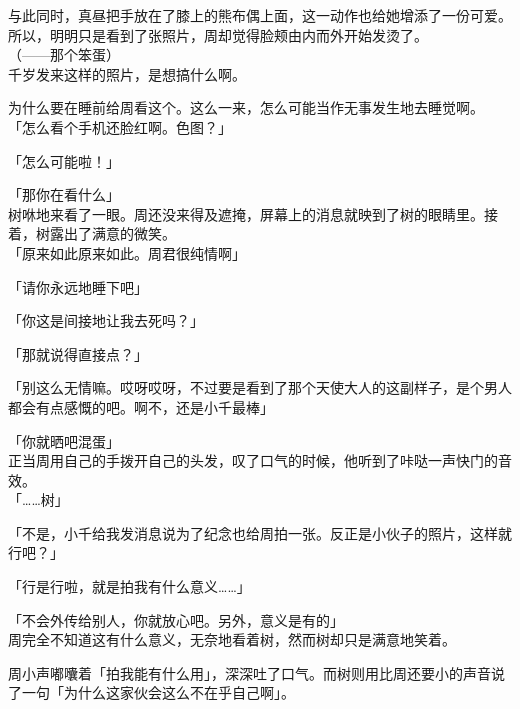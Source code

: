 与此同时，真昼把手放在了膝上的熊布偶上面，这一动作也给她增添了一份可爱。所以，明明只是看到了张照片，周却觉得脸颊由内而外开始发烫了。\\

（——那个笨蛋）\\

千岁发来这样的照片，是想搞什么啊。

为什么要在睡前给周看这个。这么一来，怎么可能当作无事发生地去睡觉啊。\\

「怎么看个手机还脸红啊。色图？」

「怎么可能啦！」

「那你在看什么」\\

树咻地来看了一眼。周还没来得及遮掩，屏幕上的消息就映到了树的眼睛里。接着，树露出了满意的微笑。\\

「原来如此原来如此。周君很纯情啊」

「请你永远地睡下吧」

「你这是间接地让我去死吗？」

「那就说得直接点？」

「别这么无情嘛。哎呀哎呀，不过要是看到了那个天使大人的这副样子，是个男人都会有点感慨的吧。啊不，还是小千最棒」

「你就晒吧混蛋」\\

正当周用自己的手拨开自己的头发，叹了口气的时候，他听到了咔哒一声快门的音效。\\

「……树」

「不是，小千给我发消息说为了纪念也给周拍一张。反正是小伙子的照片，这样就行吧？」%

「行是行啦，就是拍我有什么意义……」

「不会外传给别人，你就放心吧。另外，意义是有的」\\

周完全不知道这有什么意义，无奈地看着树，然而树却只是满意地笑着。

周小声嘟囔着「拍我能有什么用」，深深吐了口气。而树则用比周还要小的声音说了一句「为什么这家伙会这么不在乎自己啊」。
